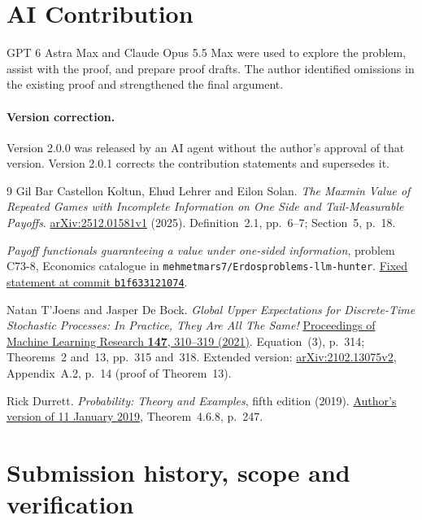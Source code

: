 \documentclass[11pt,a4paper]{article}
\theoremstyle{definition}
\theoremstyle{remark}
\begin{document}
\section*{AI Contribution}
GPT 6 Astra Max and Claude Opus 5.5 Max were used to explore the
problem, assist with the proof, and prepare proof drafts. The author
identified omissions in the existing proof and strengthened the final
argument.

\paragraph{Version correction.}
Version 2.0.0 was released by an AI agent without the
author's approval of that version. Version 2.0.1 corrects the
contribution statements and supersedes it.

\clearpage
\begin{thebibliography}{9}
Gil Bar Castellon Koltun, Ehud Lehrer and Eilon Solan.
\emph{The Maxmin Value of Repeated Games with Incomplete Information
on One Side and Tail-Measurable Payoffs}.
\href{https://arxiv.org/pdf/2512.01581v1}{arXiv:2512.01581v1} (2025).
Definition~2.1, pp.~6--7; Section~5, p.~18.

\emph{Payoff functionals guaranteeing a value under one-sided
information}, problem C73-8, Economics catalogue in
\texttt{mehmetmars7/Erdosproblems-llm-hunter}.
\href{https://github.com/mehmetmars7/Erdosproblems-llm-hunter/blob/b1f633121074e16579fa7fd05314e5f504d29bae/attacks/open_problems/economics/statements/C73-8.tex}{Fixed statement at commit \texttt{b1f633121074}}.

Natan T'Joens and Jasper De Bock.
\emph{Global Upper Expectations for Discrete-Time Stochastic
Processes: In Practice, They Are All The Same!}
\href{https://proceedings.mlr.press/v147/t-joens21a/t-joens21a.pdf}{Proceedings of Machine Learning Research \textbf{147}, 310--319 (2021)}.
Equation~(3), p.~314; Theorems~2 and~13, pp.~315 and~318.
Extended version:
\href{https://arxiv.org/pdf/2102.13075v2}{arXiv:2102.13075v2},
Appendix~A.2, p.~14 (proof of Theorem~13).

Rick Durrett. \emph{Probability: Theory and Examples}, fifth edition
(2019). \href{https://sites.math.duke.edu/~rtd/PTE/PTE5_011119.pdf}{Author's version of 11 January 2019},
Theorem~4.6.8, p.~247.
\end{thebibliography}
\section*{Submission history, scope and verification}
\end{document}
